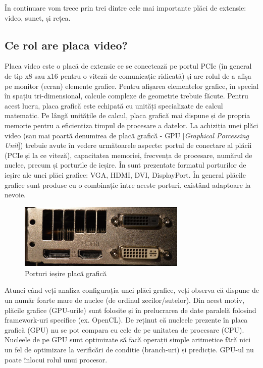 În continuare vom trece prin trei dintre cele mai importante plăci de extensie:
video, sunet, și rețea.

\subsection{Ce rol are placa video?}
\label{sec:hardware-extensii-gpu}

Placa video este o placă de extensie ce se conectează pe portul PCIe (în general
de tip x8 sau x16 pentru o viteză de comunicație ridicată) și are rolul de a
afișa pe monitor (ecran) elemente grafice. Pentru afișarea elementelor grafice,
în special în spațiu tri-dimensional, calcule complexe de geometrie trebuie
făcute. Pentru acest lucru, placa grafică este echipată cu unități specializate
de calcul matematic. Pe lângă unitățile de calcul, placa grafică mai dispune și
de propria memorie pentru a eficientiza timpul de procesare a datelor. La
achiziția unei plăci video (sau mai poartă denumirea de placă grafică - GPU
[\textit{Graphical Porcessing Unit}]) trebuie avute în vedere următoarele
aspecte: portul de conectare al plăcii (PCIe și la ce viteză), capacitatea
memoriei, frecvența de procesare, numărul de nuclee, precum și porturile de
ieșire. În  sunt prezentate formatul
porturilor de ieșire ale unei plăci grafice: VGA, HDMI, DVI, DisplayPort. În
general plăcile grafice sunt produse cu o combinație între aceste porturi,
existând adaptoare la nevoie.

\begin{figure}[!htbp]
	\centering
	\includegraphics[width=8cm]{chapters/08-hw/img/gpu-img.png}
	\caption{Porturi ieșire placă grafică\protect\footnotemark}
	\label{fig:hw-gpu}
\end{figure}


Atunci când veți analiza configurația unei plăci grafice, veți observa că
dispune de un număr foarte mare de nuclee (de ordinul zecilor/sutelor). Din
acest motiv, plăcile grafice (GPU-urile) sunt folosite și în prelucrarea de date
paralelă folosind framework-uri specifice (ex. OpenCL). De reținut că nucleele
prezente în placa grafică (GPU) nu se pot compara cu cele de pe unitatea de
procesare (CPU). Nucleele de pe GPU sunt optimizate să facă operații simple
aritmetice fără nici un fel de optimizare la verificări de condiție (branch-uri)
și predicție. GPU-ul nu poate înlocui rolul unui procesor.

